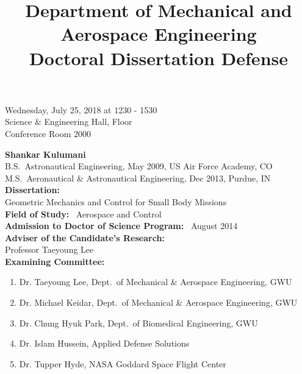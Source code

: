 \documentclass{article}
\title{Department of Mechanical and Aerospace Engineering\\
Doctoral Dissertation Defense}
\date{}
\begin{document}
\maketitle
\thispagestyle{empty}

\begin{flushright}
    Wednesday, July 25, 2018 at 1230 - 1530\\
    Science \& Engineering Hall,  Floor\\
    Conference Room 2000
\end{flushright}

\noindent \textbf{Shankar Kulumani}\\

\noindent B.S.\ Astronautical Engineering, May 2009, US Air Force Academy, CO\\
\noindent M.S.\ Aeronautical \& Astronautical Engineering, Dec 2013, Purdue, IN\\

\noindent \textbf{Dissertation:}\\

\noindent Geometric Mechanics and Control for Small Body Missions\\

\noindent \textbf{Field of Study:} \, Aerospace and Control\\

\noindent \textbf{Admission to Doctor of Science Program:} \, August 2014\\

\noindent \textbf{Adviser of the Candidate's Research:}\\

Professor Taeyoung Lee\\

\noindent \textbf{Examining Committee:}

\begin{enumerate}
    \item Dr. Taeyoung Lee, Dept.\ of Mechanical \& Aerospace Engineering, GWU
    \item Dr. Michael Keidar, Dept.\ of Mechanical \& Aerospace Engineering, GWU
    \item Dr. Chung Hyuk Park, Dept.\ of Biomedical Engineering, GWU
    \item Dr. Islam Hussein, Applied Defense Solutions
    \item Dr. Tupper Hyde, NASA Goddard Space Flight Center
\end{enumerate}
\end{document}
